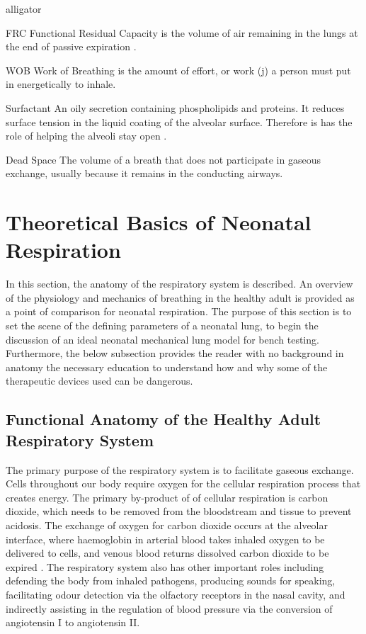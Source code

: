\documentclass[12pt, openany, oneside]{book}
\begin{document}
\begin{labeling}{alligator}
\item [FRC] Functional Residual Capacity is the volume of air remaining in the lungs at the end of passive expiration \citep{sivieri}.

\item[WOB] Work of Breathing is the amount of effort, or work (j) a person must put in energetically to inhale.

\item[Surfactant] An oily secretion containing phospholipids and proteins. It reduces surface tension in the liquid coating of the alveolar surface. Therefore is has the role of helping the alveoli stay open \citep{martini}.

\item[Dead Space] The volume of a breath that does not participate in gaseous exchange, usually because it remains in the conducting airways. 

\end{labeling}


\section{Theoretical Basics of Neonatal Respiration}
In this section, the anatomy of the respiratory system is described. An overview of the physiology and mechanics of breathing in the healthy adult is provided as a point of comparison for neonatal respiration. The purpose of this section is to set the scene of the defining parameters of a neonatal lung, to begin the discussion of an ideal neonatal mechanical lung model for bench testing. Furthermore, the below subsection provides the reader with no background in anatomy the necessary education to understand how and why some of the therapeutic devices used can be dangerous.


\subsection{Functional Anatomy of the Healthy Adult Respiratory System}

The primary purpose of the respiratory system is to facilitate gaseous exchange. Cells throughout our body require oxygen for the cellular respiration process that creates energy. The primary by-product of of cellular respiration is carbon dioxide, which needs to be removed from the bloodstream and tissue to prevent acidosis. The exchange of oxygen for carbon dioxide occurs at the alveolar interface, where haemoglobin in arterial blood takes inhaled oxygen to be delivered to cells, and venous blood returns dissolved carbon dioxide to be expired \cite{dunn2016physiology}. The respiratory system also has other important roles including defending the body from inhaled pathogens, producing sounds for speaking, facilitating odour detection via the olfactory receptors in the nasal cavity, and indirectly assisting in the regulation of blood pressure via the conversion of angiotensin I to angiotensin II. \\
\end{document}
